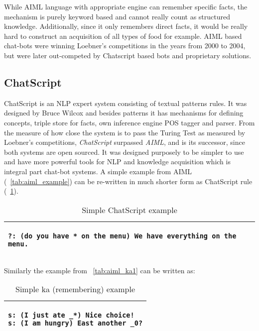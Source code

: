 While AIML language with appropriate engine can remember specific facts, the
mechanism is purely keyword based and cannot really count as structured knowledge. 
Additionally, since it only remembers direct facts, it would be
really hard to construct an acquisition of all types of food for example.
AIML based chat-bots were winning Loebner's competitions in the years from 2000
to 2004, but were later out-competed by Chatscript based bots and proprietary 
solutions.

\subsection {ChatScript}
\label{section:chatscript}
ChatScript is an NLP expert system consisting of textual patterns 
rules. It was designed by Bruce Wilcox \parencite{Wilcox2011} and besides
patterns it has mechanisms for defining concepts, triple store for facts, 
own inference engine POS tagger and parser. From the measure of how close 
the system is to pass the Turing Test as measured by Loebner's competitions, 
\emph{ChatScript} surpassed \emph{AIML},
and is its successor, since both systems are open sourced. It was designed 
purposely to be simpler to use and have more powerful tools for NLP and 
knowledge acquisition which is integral part chat-bot systems. A simple example
from AIML (\tablename~\ref{tab:aiml_example}) can be re-written in much 
shorter form as ChatScript rule (\tablename~\ref{tab:chatscript_example}).

\begin{table}[H]
	\caption{Simple ChatScript example}
	\label{tab:chatscript_example}
	\centering
	\begin{tabular}{l}
		\hline
		\lstset{breaklines=true}
		\begin{lstlisting}
?: (do you have * on the menu) We have everything on the menu.
		\end{lstlisting}  \\
		\hline
	\end{tabular}
\end{table}

Similarly the example from \tablename~\ref{tab:aiml_ka1} can be written as:
\begin{table}[H]
	\caption{Simple ka (remembering) example}
	\label{tab:chatscript_ka1}
	\centering
	\begin{tabular}{l}
		\hline
		\lstset{breaklines=true}
		\begin{lstlisting}
s: (I just ate _*) Nice choice!
s: (I am hungry) East another _0?
		\end{lstlisting}  \\
		\hline
	\end{tabular}
\end{table}

